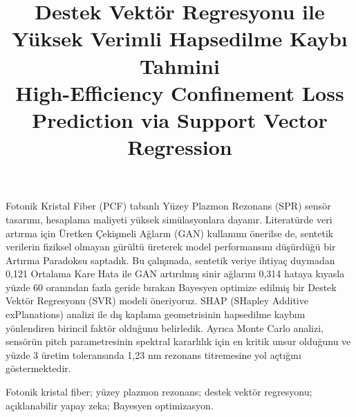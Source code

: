 \documentclass[conference]{IEEEtran}
\begin{document}

\title{Destek Vektör Regresyonu ile Yüksek Verimli Hapsedilme Kaybı Tahmini\\
    High-Efficiency Confinement Loss Prediction via Support Vector Regression}

\author{
\and
{}
\and
{}
}

\maketitle

\begin{ozet}
Fotonik Kristal Fiber (PCF) tabanlı Yüzey Plazmon Rezonans (SPR) sensör tasarımı, hesaplama maliyeti yüksek simülasyonlara dayanır. Literatürde veri artırma için Üretken Çekişmeli Ağların (GAN) kullanımı önerilse de, sentetik verilerin fiziksel olmayan gürültü üreterek model performansını düşürdüğü bir Artırma Paradoksu saptadık. Bu çalışmada, sentetik veriye ihtiyaç duymadan 0,121 Ortalama Kare Hata ile GAN artırılmış sinir ağlarını 0,314 hataya kıyasla yüzde 60 oranından fazla geride bırakan Bayesyen optimize edilmiş bir Destek Vektör Regresyonu (SVR) modeli öneriyoruz. SHAP (SHapley Additive exPlanations) analizi ile dış kaplama geometrisinin hapsedilme kaybını yönlendiren birincil faktör olduğunu belirledik. Ayrıca Monte Carlo analizi, sensörün pitch parametresinin spektral kararlılık için en kritik unsur olduğunu ve yüzde 3 üretim toleransında 1,23 nm rezonans titremesine yol açtığını göstermektedir.
\end{ozet}

\begin{IEEEanahtar}
Fotonik kristal fiber; yüzey plazmon rezonans; destek vektör regresyonu; açıklanabilir yapay zeka; Bayesyen optimizasyon.
\end{IEEEanahtar}
\end{document}
